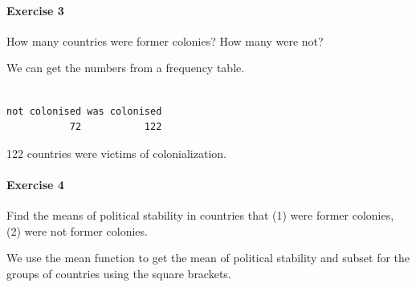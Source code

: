 \documentclass[]{article}
\newenvironment{Shaded}{\begin{snugshade}}{\end{snugshade}}
\newcommand{\KeywordTok}[1]{\textcolor[rgb]{0.13,0.29,0.53}{\textbf{#1}}}
\newcommand{\DataTypeTok}[1]{\textcolor[rgb]{0.13,0.29,0.53}{#1}}
\newcommand{\DecValTok}[1]{\textcolor[rgb]{0.00,0.00,0.81}{#1}}
\newcommand{\StringTok}[1]{\textcolor[rgb]{0.31,0.60,0.02}{#1}}
\newcommand{\CommentTok}[1]{\textcolor[rgb]{0.56,0.35,0.01}{\textit{#1}}}
\newcommand{\OperatorTok}[1]{\textcolor[rgb]{0.81,0.36,0.00}{\textbf{#1}}}
\newcommand{\NormalTok}[1]{#1}
\let\oldparagraph\paragraph
\renewcommand{\paragraph}[1]{\oldparagraph{#1}\mbox{}}
\theoremstyle{definition}
\theoremstyle{definition}
\theoremstyle{definition}
\theoremstyle{remark}
\begin{document}
\begin{Shaded}
\end{Shaded}

\paragraph{Exercise 3}\label{exercise-3-3}

How many countries were former colonies? How many were not?

We can get the numbers from a frequency table.

\begin{Shaded}
\end{Shaded}

\begin{verbatim}

not colonised was colonised 
           72           122 
\end{verbatim}

122 countries were victims of colonialization.

\paragraph{Exercise 4}\label{exercise-4-3}

Find the means of political stability in countries that (1) were former
colonies, (2) were not former colonies.

We use the mean function to get the mean of political stability and
subset for the groups of countries using the square brackets.

\begin{Shaded}
\end{Shaded}
\end{document}
